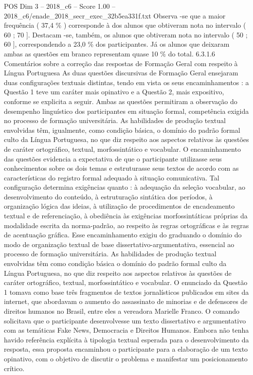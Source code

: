 \begin{textsample}{POS Dim 3 – 2018\_c6 – Score 1.00 – 2018\_c6/enade\_2018\_secr\_exec\_32b5ea331f.txt}
Observa -se que a maior frequência ( 37,4 \% ) corresponde à dos alunos que obtiveram nota no intervalo ( 60 ; 70 ].
Destacam -se, também, os alunos que obtiveram nota no intervalo ( 50 ; 60 ], correspondendo a 23,0 \% dos participantes.
Já os alunos que deixaram ambas as questões em branco representam quase 10 \% do total. 6.3.1.6 Comentários sobre a correção das respostas de Formação Geral com respeito à Língua Portuguesa As duas questões discursivas de Formação Geral ensejaram duas configurações textuais distintas, tendo em vista os seus encaminhamentos : a Questão 1 teve um caráter mais opinativo e a Questão 2, mais expositivo, conforme se explicita a seguir.
Ambas as questões permitiram a observação do desempenho linguístico dos participantes em situação formal, competência exigida no processo de formação universitária.
As habilidades de produção textual envolvidas têm, igualmente, como condição básica, o domínio do padrão formal culto da Língua Portuguesa, no que diz respeito aos aspectos relativos às questões de caráter ortográfico, textual, morfossintático e vocabular.
O encaminhamento das questões evidencia a expectativa de que o participante utilizasse seus conhecimentos sobre os dois temas e estruturasse seus textos de acordo com as características do registro formal adequado à situação comunicativa.
Tal configuração determina exigências quanto : à adequação da seleção vocabular, ao desenvolvimento do conteúdo, à estruturação sintática dos períodos, à organização lógica das ideias, à utilização de procedimentos de encadeamento textual e de referenciação, à obediência às exigências morfossintáticas próprias da modalidade escrita da norma-padrão, ao respeito às regras ortográficas e às regras de acentuação gráfica.
Esse encaminhamento exigiu do graduando o domínio do modo de organização textual de base dissertativo-argumentativa, essencial ao processo de formação universitária.
As habilidades de produção textual envolvidas têm como condição básica o domínio do padrão formal culto da Língua Portuguesa, no que diz respeito aos aspectos relativos às questões de caráter ortográfico, textual, morfossintático e vocabular.
O enunciado da Questão 1 tomava como base três fragmentos de textos jornalísticos publicados em sites da internet, que abordavam o aumento do assassinato de minorias e de defensores de direitos humanos no Brasil, entre eles a vereadora Marielle Franco.
O comando solicitava que o participante desenvolvesse um texto dissertativo e argumentativo com as temáticas Fake News, Democracia e Direitos Humanos.
Embora não tenha havido referência explícita à tipologia textual esperada para o desenvolvimento da resposta, essa proposta encaminhou o participante para a elaboração de um texto opinativo, com o objetivo de discutir o problema e manifestar um posicionamento crítico.

\end{textsample}

